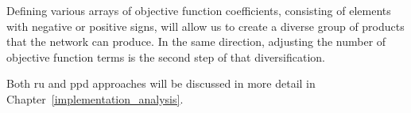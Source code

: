 Defining various arrays of objective function coefficients, consisting of elements with negative or positive signs, will allow us to create a diverse group of products that the network can produce. In the same direction, adjusting the number of objective function terms is the second step of that diversification.

Both \acf{ru} and \acf{ppd} approaches will be discussed in more detail in Chapter~\ref{implementation_analysis}.